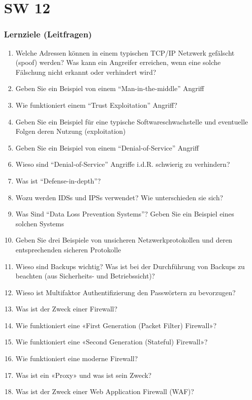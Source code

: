\part{SW 12}
\section{Lernziele (Leitfragen)}
\begin{enumerate}
    \item Welche Adressen können in einem typischen TCP/IP Netzwerk gefälscht (spoof) werden? Was kann ein Angreifer erreichen, wenn eine solche Fälschung nicht erkannt oder verhindert wird?
    \item Geben Sie ein Beispiel von einem "`Man-in-the-middle"' Angriff
    \item Wie funktioniert einem "`Trust Exploitation"' Angriff?
    \item Geben Sie ein Beispiel für eine typische Softwareschwachstelle und eventuelle Folgen deren Nutzung (exploitation)
    \item Geben Sie ein Beispiel von einem "`Denial-of-Service"' Angriff
    \item Wieso sind "`Denial-of-Service"' Angriffe i.d.R. schwierig zu verhindern?
    \item Was ist "`Defense-in-depth"'?
    \item Wozu werden IDSs und IPSs verwendet? Wie unterschieden sie sich?
    \item Was Sind "`Data Loss Prevention Systems"'? Geben Sie ein Beispiel eines solchen Systems
    \item Geben Sie drei Beispiele von unsicheren Netzwerkprotokollen und deren entsprechenden sicheren Protokolle
    \item Wieso sind Backups wichtig? Was ist bei der Durchführung von Backups zu beachten (aus Sicherheits- und Betriebssicht)?
    \item Wieso ist Multifaktor Authentifizierung den Passwörtern zu bevorzugen?
    \item Was ist der Zweck einer Firewall?
    \item Wie funktioniert eine «First Generation (Packet Filter) Firewall»?
    \item Wie funktioniert eine «Second Generation (Stateful) Firewall»?
    \item Wie funktioniert eine moderne Firewall?
    \item Was ist ein «Proxy» und was ist sein Zweck?
    \item Was ist der Zweck einer Web Application Firewall (WAF)?
\end{enumerate}

